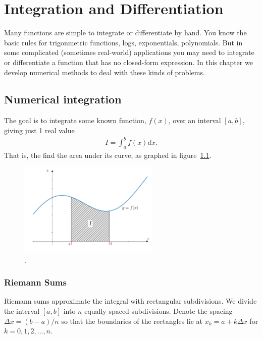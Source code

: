 \chapter{Integration and Differentiation} \label{ch:intdiff}

Many functions are simple to integrate or differentiate by hand. You know the basic rules for trigonmetric functions, logs, exponentials, polynomials. But in some complicated (sometimes real-world) applications you may need to integrate or differentiate a function that has no closed-form expression. In this chapter we develop numerical methods to deal with these kinds of problems.

\section{Numerical integration}
The goal is to integrate some known function, $f(x)$, over an interval $[a,b]$, giving just 1 real value
\begin{align*}
I = \int_a^b f(x) dx.
\end{align*}
That is, the find the area under its curve, as graphed in figure~\ref{fig:ch5_integration}.

\begin{figure}[H]
	\begin{center}
	\includegraphics[width=0.6\textwidth]{figures/ch5_integration.pdf} 
	  \caption{.} \label{fig:ch5_integration}
	\end{center}
\end{figure}

\subsection{Riemann Sums}
Riemann sums approximate the integral with rectangular subdivisions. We divide the interval $[a,b]$ into $n$ equally spaced subdivisions. Denote the spacing $\Delta x = (b-a)/n$ so that the boundaries of the rectangles lie at $x_k = a + k\Delta x$ for $k=0,1,2,\dots,n$.

